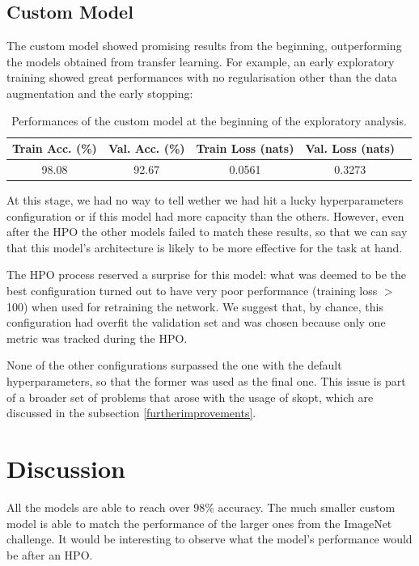 \subsection{Custom Model}
The custom model showed promising results from the beginning, outperforming the models obtained from transfer learning. For example, an early exploratory training showed great performances with no regularisation other than the data augmentation and the early stopping:
\begin{table}[h!]
	\centering
	\begin{tabular}{ |c|c|c|c|c| }
		\hline
		Train Acc. (\%) & Val. Acc. (\%) & Train Loss (nats) & Val. Loss (nats)\\
		\hline
		98.08 & 92.67 & 0.0561 & 0.3273\\
		\hline
	\end{tabular}
	\caption{Performances of the custom model at the beginning of the exploratory analysis.}
	\label{tbl:custom_model_performance_beginning}
\end{table}

At this stage, we had no way to tell wether we had hit a lucky hyperparameters configuration or if this model had more capacity than the others. However, even after the HPO the other models failed to match these results, so that we can say that this model's architecture is likely to be more effective for the task at hand.

The HPO process reserved a surprise for this model: what was deemed to be the best configuration turned out to have very poor performance (training loss $>$ 100) when used for retraining the network. We suggest that, by chance, this configuration had overfit the validation set and was chosen because only one metric was tracked during the HPO.

None of the other configurations surpassed the one with the default hyperparameters, so that the former was used as the final one. This issue is part of a broader set of problems that arose with the usage of skopt, which are discussed in the subsection \ref{furtherimprovements}.

\section{Discussion}
All the models are able to reach over 98\% accuracy. The much smaller custom model is able to match the performance of the larger ones from the ImageNet challenge. It would be interesting to observe what the model's performance would be after an HPO.

